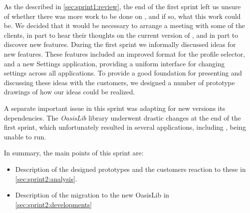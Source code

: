 As the described in \cref{sec:sprint1:review}, the end of the first sprint left us unsure of whether there was more work to be done on \launcher, and if so, what this work could be. 
We decided that it would be necessary to arrange a meeting with some of the clients, in part to hear their thoughts on the current version of \launcher, and in part to discover new features.
During the first sprint we informally discussed ideas for new features.
These features included an improved format for the profile selector, and a new Settings application, providing a uniform interface for changing settings across all applications. 
To provide a good foundation for presenting and discussing these ideas with the customers, we designed a number of prototype drawings of how our ideas could be realized.

A separate important issue in this sprint was adapting \launcher for new versions its dependencies. The \textit{OasisLib} library underwent drastic changes at the end of the first sprint, which unfortunately resulted in several applications, including \launcher, being unable to run.

In summary, the main points of this sprint are:

\begin{itemize}
\item Description of the designed prototypes and the customers reaction to these in \cref{sec:sprint2:analysis}.
\item Description of the migration to the new OasisLib in \cref{sec:sprint2:developments}
\end{itemize}